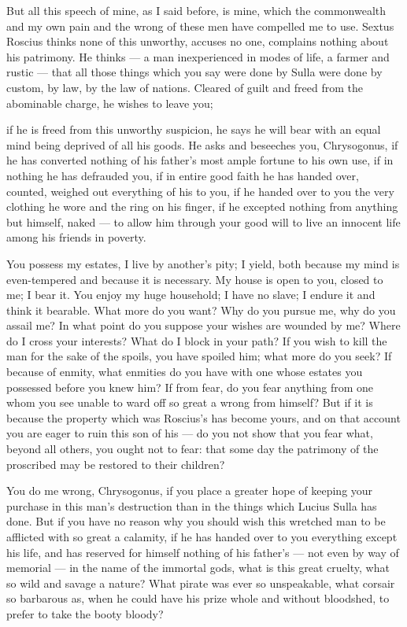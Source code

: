  But all this speech of mine, as I said before, is mine, which the commonwealth and my own pain and the wrong of these men have compelled me to use. Sextus Roscius thinks none of this unworthy, accuses no one, complains nothing about his patrimony. He thinks --- a man inexperienced in modes of life, a farmer and rustic --- that all those things which you say were done by Sulla were done by custom, by law, by the law of nations. Cleared of guilt and freed from the abominable charge, he wishes to leave you;

 if he is freed from this unworthy suspicion, he says he will bear with an equal mind being deprived of all his goods. He asks and beseeches you, Chrysogonus, if he has converted nothing of his father's most ample fortune to his own use, if in nothing he has defrauded you, if in entire good faith he has handed over, counted, weighed out everything of his to you, if he handed over to you the very clothing he wore and the ring on his finger, if he excepted nothing from anything but himself, naked --- to allow him through your good will to live an innocent life among his friends in poverty.

 You possess my estates, I live by another's pity; I yield, both because my mind is even-tempered and because it is necessary. My house is open to you, closed to me; I bear it. You enjoy my huge household; I have no slave; I endure it and think it bearable. What more do you want? Why do you pursue me, why do you assail me? In what point do you suppose your wishes are wounded by me? Where do I cross your interests? What do I block in your path? If you wish to kill the man for the sake of the spoils, you have spoiled him; what more do you seek? If because of enmity, what enmities do you have with one whose estates you possessed before you knew him? If from fear, do you fear anything from one whom you see unable to ward off so great a wrong from himself? But if it is because the property which was Roscius's has become yours, and on that account you are eager to ruin this son of his --- do you not show that you fear what, beyond all others, you ought not to fear: that some day the patrimony of the proscribed may be restored to their children?

 You do me wrong, Chrysogonus, if you place a greater hope of keeping your purchase in this man's destruction than in the things which Lucius Sulla has done. But if you have no reason why you should wish this wretched man to be afflicted with so great a calamity, if he has handed over to you everything except his life, and has reserved for himself nothing of his father's --- not even by way of memorial --- in the name of the immortal gods, what is this great cruelty, what so wild and savage a nature? What pirate was ever so unspeakable, what corsair so barbarous as, when he could have his prize whole and without bloodshed, to prefer to take the booty bloody?

